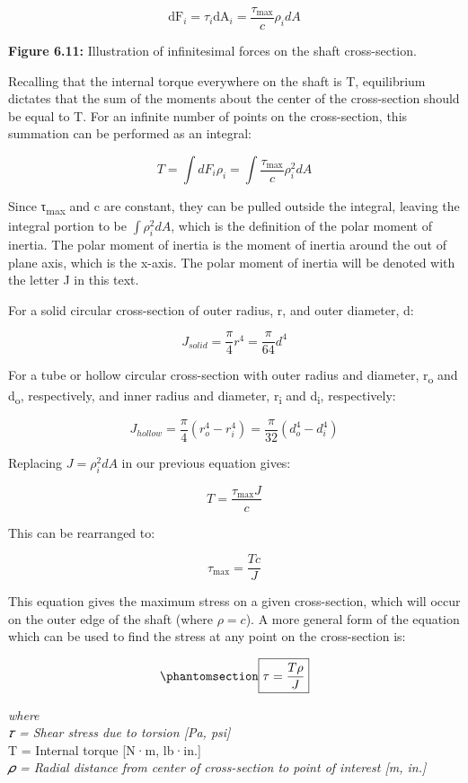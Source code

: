 \documentclass[
  letterpaper,
  DIV=11,
  numbers=noendperiod]{scrreprt}
\theoremstyle{definition}
\theoremstyle{remark}
\begin{document}
\[
\mathrm{dF}_i=\tau_i \mathrm{dA}_i=\frac{\tau_{\max }}{c} \rho_i d A
\]

\textbf{Figure 6.11:} Illustration of infinitesimal forces on the shaft
cross-section.

Recalling that the internal torque everywhere on the shaft is T,
equilibrium dictates that the sum of the moments about the center of the
cross-section should be equal to T. For an infinite number of points on
the cross-section, this summation can be performed as an integral:

\[
T=\int d F_i \rho_i=\int \frac{\tau_{\max }}{c} \rho_i^2 d A
\]

Since τ\textsubscript{max} and c are constant, they can be pulled
outside the integral, leaving the integral portion to be
\(\int \rho_i^2 d A\), which is the definition of the polar moment of
inertia. The polar moment of inertia is the moment of inertia around the
out of plane axis, which is the x-axis. The polar moment of inertia will
be denoted with the letter J in this text.

For a solid circular cross-section of outer radius, r, and outer
diameter, d:

\[
J_{solid}=\frac{\pi}{4} r^4=\frac{\pi}{64} d^4
\]

For a tube or hollow circular cross-section with outer radius and
diameter, r\textsubscript{o} and d\textsubscript{o}, respectively, and
inner radius and diameter, r\textsubscript{i} and d\textsubscript{i},
respectively:

\[
J_{hollow}=\frac{\pi}{4}\left(r_o^4-r_i^4\right)=\frac{\pi}{32}\left(d_o^4-d_i^4\right)
\]

Replacing \(J=\rho^2_idA\) in our previous equation gives:

\[
T=\frac{\tau_{\max } J}{c}
\]

This can be rearranged to:

\[
\tau_{\max }=\frac{T c}{J}
\]

This equation gives the maximum stress on a given cross-section, which
will occur on the outer edge of the shaft (where \(\rho=c\)). A more
general form of the equation which can be used to find the stress at any
point on the cross-section is:

\begin{equation}\phantomsection\label{eq-6.1}{
\boxed{\tau=\frac{T \rho}{J}}
}\end{equation}

\emph{where}\\
\emph{𝜏 = Shear stress due to torsion {[}Pa, psi{]}}\\
T = Internal torque {[}N·m, lb·in.{]}\\
\emph{𝜌 = Radial distance from center of cross-section to point of
interest {[}m, in.{]}}
\end{document}
